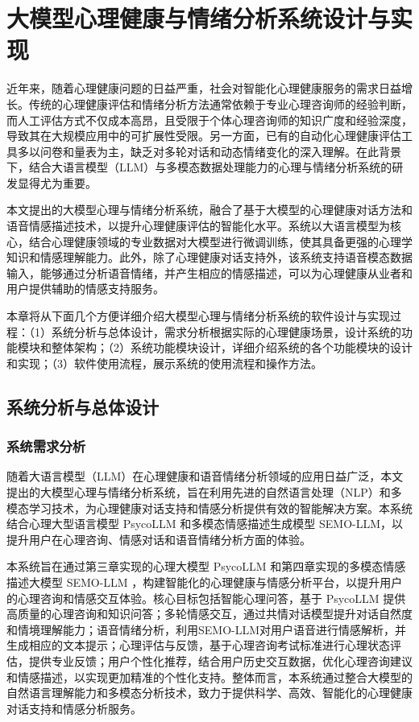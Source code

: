 
\chapter{大模型心理健康与情绪分析系统设计与实现}

近年来，随着心理健康问题的日益严重，社会对智能化心理健康服务的需求日益增长。传统的心理健康评估和情绪分析方法通常依赖于专业心理咨询师的经验判断，而人工评估方式不仅成本高昂，且受限于个体心理咨询师的知识广度和经验深度，导致其在大规模应用中的可扩展性受限。另一方面，已有的自动化心理健康评估工具多以问卷和量表为主，缺乏对多轮对话和动态情绪变化的深入理解。在此背景下，结合大语言模型（LLM）与多模态数据处理能力的心理与情绪分析系统的研发显得尤为重要。

本文提出的大模型心理与情绪分析系统，融合了基于大模型的心理健康对话方法和语音情感描述技术，以提升心理健康评估的智能化水平。系统以大语言模型为核心，结合心理健康领域的专业数据对大模型进行微调训练，使其具备更强的心理学知识和情感理解能力。此外，除了心理健康对话支持外，该系统支持语音模态数据输入，能够通过分析语音情绪，并产生相应的情感描述，可以为心理健康从业者和用户提供辅助的情感支持服务。

本章将从下面几个方便详细介绍大模型心理与情绪分析系统的软件设计与实现过程：（1）系统分析与总体设计，需求分析根据实际的心理健康场景，设计系统的功能模块和整体架构；（2）系统功能模块设计，详细介绍系统的各个功能模块的设计和实现；（3）软件使用流程，展示系统的使用流程和操作方法。

\section{系统分析与总体设计}

\subsection{系统需求分析}

随着大语言模型（LLM）在心理健康和语音情绪分析领域的应用日益广泛，本文提出的大模型心理与情绪分析系统，旨在利用先进的自然语言处理（NLP）和多模态学习技术，为心理健康对话支持和情感分析提供有效的智能解决方案。本系统结合心理大型语言模型 PsycoLLM 和多模态情感描述生成模型 SEMO-LLM，以提升用户在心理咨询、情感对话和语音情绪分析方面的体验。

本系统旨在通过第三章实现的心理大模型 PsycoLLM 和第四章实现的多模态情感描述大模型 SEMO-LLM ，构建智能化的心理健康与情感分析平台，以提升用户的心理咨询和情感交互体验。核心目标包括智能心理问答，基于 PsycoLLM 提供高质量的心理咨询和知识问答；多轮情感交互，通过共情对话模型提升对话自然度和情境理解能力；语音情绪分析，利用SEMO-LLM对用户语音进行情感解析，并生成相应的文本提示；心理评估与反馈，基于心理咨询考试标准进行心理状态评估，提供专业反馈；用户个性化推荐，结合用户历史交互数据，优化心理咨询建议和情感描述，以实现更加精准的个性化支持。整体而言，本系统通过整合大模型的自然语言理解能力和多模态分析技术，致力于提供科学、高效、智能化的心理健康对话支持和情感分析服务。

